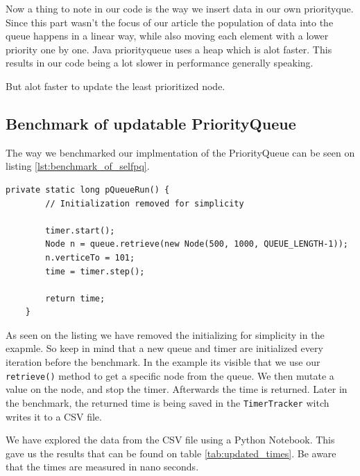 \documentclass{article}
\begin{document}
Now a thing to note in our code is the way we insert data in our own priorityque. Since this part wasn't the focus of our article the population of data into the queue happens in a linear way, while also moving each element with a lower priority one by one. 
Java priorityqueue uses a heap which is alot faster. This results in our code being a lot slower in performance generally speaking.

But alot faster to update the least prioritized node.

\subsection{Benchmark of updatable PriorityQueue} %
The way we benchmarked our implmentation of the PriorityQueue can be seen on listing \ref{lst:benchmark_of_selfpq}.

\begin{lstlisting}[caption={Benchmark implmentation on our PriorityQueue},label={lst:benchmark_of_selfpq}]
    private static long pQueueRun() {
        // Initialization removed for simplicity

        timer.start();
        Node n = queue.retrieve(new Node(500, 1000, QUEUE_LENGTH-1));
        n.verticeTo = 101;
        time = timer.step();

        return time;
    }
\end{lstlisting}

As seen on the listing we have removed the initializing for simplicity in the exapmle. 
So keep in mind that a new queue and timer are initialized every iteration before the benchmark. 
In the example its visible that we use our \lstinline{retrieve()} method to get a specific 
node from the queue. We then mutate a value on the node, and stop the timer. 
Afterwards the time is returned. Later in the benchmark, the returned time is being saved in the
\lstinline{TimerTracker} witch writes it to a CSV file. 

We have explored the data from the CSV file using a Python Notebook. This gave us the 
results that can be found on table \ref{tab:updated_times}. Be aware that the times are measured in nano seconds. 
\end{document}
